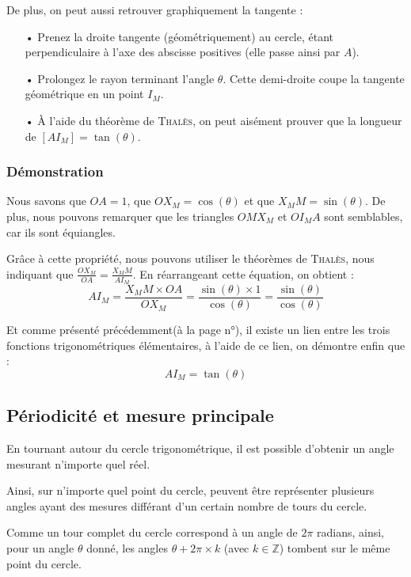 \documentclass[a4paper]{article}
\begin{document}
			De plus, on peut aussi retrouver graphiquement la tangente :
			\begin{itemize}
				\item [•] Prenez la droite tangente (géométriquement) au cercle, étant perpendiculaire à l'axe des abscisse positives (elle passe ainsi par $A$).
				\item [•] Prolongez le rayon terminant l'angle $\theta$. Cette demi-droite coupe la tangente géométrique en un point $I_M$.
				\item [•] À l'aide du théorème de \textsc{Thalès}, on peut aisément prouver que la longueur de $[AI_M] = \tan(\theta)$.
			\end{itemize}

			\subsubsection*{Démonstration}
			
			Nous savons que $OA = 1$, que $OX_M = \cos(\theta)$ et que $X_MM = \sin(\theta)$.
			De plus, nous pouvons remarquer que les triangles $OMX_M$ et $OI_MA$ sont semblables, car ils sont équiangles.

			Grâce à cette propriété, nous pouvons utiliser le théorèmes de \textsc{Thalès}, nous indiquant que $\frac{OX_M}{OA} = \frac{X_MM}{AI_M}$.
			En réarrangeant cette équation, on obtient : 
				$${AI_M} = \frac{X_MM \times OA}{OX_M} = \frac{\sin(\theta) \times 1}{\cos(\theta)} = \frac{\sin(\theta)}{\cos(\theta)}$$

			Et comme présenté précédemment(à la page n°\pageref{lien_fct_trigo}), 
			il existe un lien entre les trois fonctions trigonométriques élémentaires, 
			à l'aide de ce lien, on démontre enfin que : 
				$${AI_M} = \tan(\theta)$$

\newpage

		\subsection{Périodicité et mesure principale}

			En tournant autour du cercle trigonométrique,
			il est possible d'obtenir un angle mesurant n'importe quel réel.
			
			Ainsi, sur n'importe quel point du cercle,
			peuvent être représenter plusieurs angles ayant des mesures
			différant d'un certain nombre de tours du cercle.

			Comme un tour complet du cercle correspond à un angle de $2 \pi$ radians,
			ainsi, pour un angle $\theta$ donné,
			les angles $\theta + 2 \pi \times k$ (avec $k \in \mathbb{Z}$)
			tombent sur le même point du cercle.
\end{document}
